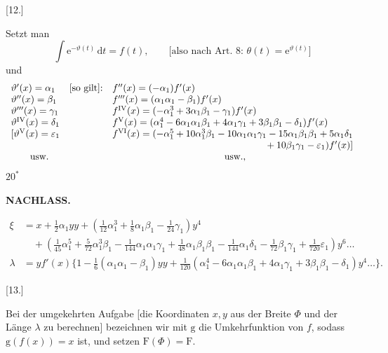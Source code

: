 \begin{center}[12.]\end{center}
Setzt man
\[
\int\mathrm e^{-\vartheta(t)}\,\mathrm dt=f(t),\qquad
\text{[also nach Art.\ 8: }\theta(t)=\mathrm e^{\vartheta(t)}\text{]}
\]
\noindent und
\[
\begin{array}{l@{\quad}l@{\quad}l}
\vartheta'(x)=\alpha_1&\text{[so gilt]:}&f''(x)=(-\alpha_1)f'(x)\\
\vartheta''(x)=\beta_1&&f'''(x)=(\alpha_1\alpha_1-\beta_1)f'(x)\\
\vartheta'''(x)=\gamma_1&&
 f^{\mathrm{IV}}(x)=(-\alpha_1^3+3\alpha_1\beta_1-\gamma_1)f'(x)\\
\vartheta^{\mathrm{IV}}(x)=\delta_1&&
 f^{\mathrm V}(x)=(\alpha_1^4-6\alpha_1\alpha_1\beta_1+4\alpha_1\gamma_1
 +3\beta_1\beta_1-\delta_1)f'(x)\\
\mathopen{[}\vartheta^{\mathrm V}(x)=\varepsilon_1&&
 f^{\mathrm{VI}}(x)=(-\alpha_1^5+10\alpha_1^3\beta_1-10\alpha_1\alpha_1\gamma_1
 -15\alpha_1\beta_1\beta_1+5\alpha_1\delta_1\\
&&\multicolumn{1}{r}{{}+10\beta_1\gamma_1-\varepsilon_1)f'(x)]}\\
\qquad\text{usw.}&&\multicolumn{1}{c}{\text{usw.,}}
\end{array}
\]
\noindent\hfill \(20^{*}\)\hspace*{.17\linewidth}\par
\par\clearpage
\noindent{}\hfill{\small\textbf{NACHLASS.}}\hfill\null\par\medskip

\[
\begin{aligned}
\xi&=x+\tfrac12\alpha_1yy+
  (\tfrac1{12}\alpha_1^3+\tfrac18\alpha_1\beta_1-\tfrac1{24}\gamma_1)y^4\\
 &\quad+(\tfrac1{45}\alpha_1^5+\tfrac5{72}\alpha_1^3\beta_1
 -\tfrac1{144}\alpha_1\alpha_1\gamma_1+\tfrac1{48}\alpha_1\beta_1\beta_1
 -\tfrac1{144}\alpha_1\delta_1-\tfrac1{72}\beta_1\gamma_1
 +\tfrac1{720}\varepsilon_1)y^6\ldots\\
\lambda&=yf'(x)\{1-\tfrac16(\alpha_1\alpha_1-\beta_1)yy+
  \tfrac1{120}(\alpha_1^4-6\alpha_1\alpha_1\beta_1+4\alpha_1\gamma_1
  +3\beta_1\beta_1-\delta_1)y^4\ldots\}.
\end{aligned}
\]

\begin{center}
[13.]\par{}
\end{center}
Bei der umgekehrten Aufgabe [die Koordinaten \(x,y\) aus der Breite \(\Phi\) und
der Länge \(\lambda\) zu berechnen] bezeichnen wir mit \(\mathrm g\) die Umkehrfunktion
von \(f\), sodass \(\mathrm g(f(x))=x\) ist, und setzen \(\mathrm F(\Phi)=\mathrm F\).

